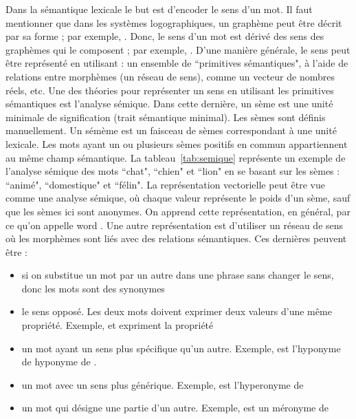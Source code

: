 \documentclass{KodeBook}
\begin{document}
Dans la sémantique lexicale le but est d'encoder le sens d'un mot. 
Il faut mentionner que dans les systèmes logographiques, un graphème peut être décrit par sa forme ; par exemple, .
Donc, le sens d'un mot est dérivé des sens des graphèmes qui le composent ; par exemple, .
D'une manière générale, le sens peut être représenté en utilisant : un ensemble de ``primitives sémantiques", à l'aide de relations entre morphèmes (un réseau de sens), comme un vecteur de nombres réels, etc.
Une des théories pour représenter un sens en utilisant les primitives sémantiques est l'analyse sémique. 
Dans cette dernière, un sème est une unité minimale de signification (trait sémantique minimal). 
Les sèmes sont définis manuellement. 
Un sémème est un faisceau de sèmes correspondant à une unité lexicale. 
Les mots ayant un ou plusieurs sèmes positifs en commun appartiennent au même champ sémantique.  
La tableau~\ref{tab:semique} représente un exemple de l'analyse sémique des mots ``chat", ``chien" et ``lion" en se basant sur les sèmes : ``animé", ``domestique" et ``félin". 
La représentation vectorielle peut être vue comme une analyse sémique, où chaque valeur représente le poids d'un sème, sauf que les sèmes ici sont anonymes. 
On apprend cette représentation, en général, par ce qu'on appelle word . 
Une autre représentation est d'utiliser un réseau de sens où les morphèmes sont liés avec des relations sémantiques.
Ces dernières peuvent être : 
\begin{itemize}
	\item {} si on substitue un mot par un autre dans une phrase sans changer le sens, donc les mots sont des synonymes
	\item {} le sens opposé. Les deux mots doivent exprimer deux valeurs d'une même propriété. Exemple,  et  expriment la propriété 
	\item {} un mot ayant un sens plus spécifique qu'un autre. Exemple,  est l'hyponyme de  hyponyme de . 
	\item {} un mot avec un sens plus générique. Exemple,  est l'hyperonyme de 
	\item {} un mot qui désigne une partie d'un autre. Exemple,  est un méronyme de 
\end{itemize}
\end{document}
